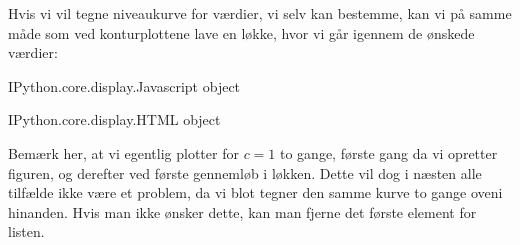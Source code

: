 \documentclass[letterpaper,10pt,english]{jupyterBook}
\begin{document}
Hvis vi vil tegne niveaukurve for værdier, vi selv kan bestemme, kan vi på samme måde som ved konturplottene lave en løkke, hvor vi går igennem de ønskede værdier:

\begin{sphinxVerbatim}[commandchars=\\\{\}]
  \PYG{p}{[}    \PYG{p}{]}

             

      
          
    \PYG{p}{[}\PYG{p}{]}

\end{sphinxVerbatim}

\begin{sphinxVerbatim}[commandchars=\\\{\}]
\PYGZlt{}IPython.core.display.Javascript object\PYGZgt{}
\end{sphinxVerbatim}

\begin{sphinxVerbatim}[commandchars=\\\{\}]
\PYGZlt{}IPython.core.display.HTML object\PYGZgt{}
\end{sphinxVerbatim}

Bemærk her, at vi egentlig plotter for \(c = 1\) to gange, første gang da vi opretter figuren, og derefter ved første gennemløb i løkken. Dette vil dog i næsten alle tilfælde ikke være et problem, da vi blot tegner den samme kurve to gange oveni hinanden. Hvis man ikke ønsker dette, kan man fjerne det første element for listen.
\end{document}
